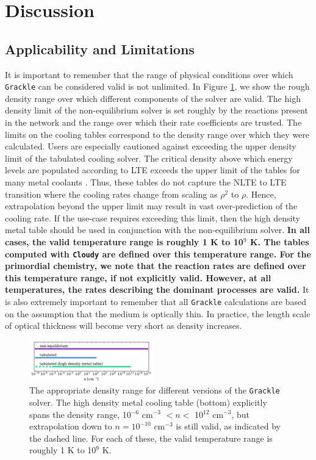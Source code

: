 \section{Discussion} \label{sec:summary}

\subsection{Applicability and Limitations}

It is important to remember that the range of physical conditions over
which \texttt{Grackle} can be considered valid is not unlimited.  In Figure
\ref{fig:valid-range}, we show the rough density range over which
different components of the solver are valid.  The high density limit
of the non-equilibrium solver is set roughly by the reactions present
in the network and the range over which their rate coefficients are
trusted.  The limits on the cooling tables correspond to the density
range over which they were calculated.  Users are especially
cautioned against exceeding the upper density limit of the tabulated
cooling solver.  The critical density above which energy levels are
populated according to LTE exceeds the upper limit of the tables for
many metal coolants \citep{2008MNRAS.385.1443S}.  Thus, these tables
do not capture the NLTE to LTE transition where the cooling rates
change from scaling as $\rho^{2}$ to $\rho$.  Hence, extrapolation
beyond the upper limit may result in vast over-prediction of the
cooling rate.  If the use-case requires exceeding this limit, then the
high density metal table should be used in conjunction with the
non-equilibrium solver.  {\bf In all cases, the valid temperature range is
roughly 1 K to 10$^{9}$ K.  The tables computed with \texttt{Cloudy}
are defined over this temperature range.  For the primordial
chemistry, we note that the reaction rates are defined over this
temperature range, if not explicitly valid.  However, at all
temperatures, the rates describing the dominant processes are valid.}
It is also extremely important to remember
that all \texttt{Grackle} calculations are based on the assumption that the
medium is optically thin.  In practice, the length scale of optical
thickness will become very short as density increases.

\begin{figure}
  \centering
  \includegraphics[width=0.48\textwidth]{valid_range.pdf}
  \caption{
    The appropriate density range for different versions of the
    \texttt{Grackle} solver.  The high density metal cooling table (bottom)
    explicitly spans the density range, 10$^{-6}$ cm$^{-3}$ $< n <$
    10$^{12}$ cm$^{-3}$, but extrapolation down to $n = 10^{-10}$ cm$^{-3}$ 
    is still valid, as indicated by the dashed line.  For each
    of these, the valid temperature range is roughly 1 K to 10$^{9}$
    K.
  } \label{fig:valid-range}
\end{figure}

